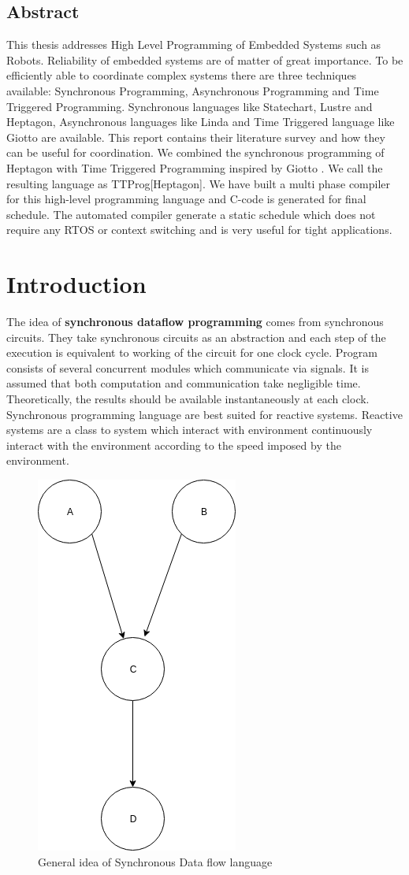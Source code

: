 \documentclass[16pt]{report}
\begin{document}
\section*{Abstract}
This thesis addresses High Level Programming of Embedded Systems such as Robots. Reliability of embedded systems are of matter of great importance. To be efficiently able to coordinate complex systems there are three techniques available: Synchronous Programming, Asynchronous Programming and Time Triggered Programming. Synchronous languages like Statechart, Lustre and Heptagon, Asynchronous languages like Linda and Time Triggered language like Giotto are available. This report contains their literature survey and how they can be useful for coordination. We combined the synchronous programming of Heptagon \cite{heptagon} with Time Triggered Programming inspired by Giotto \cite{giotto}. We call the resulting language as TTProg[Heptagon]. We have built a multi phase compiler for this high-level programming language and C-code is generated for final schedule. The automated compiler generate a static schedule which does not require any RTOS or context switching and is very useful for tight applications.

\tableofcontents
\newpage
\listoffigures

\newpage


\chapter{Introduction}
The idea of \textbf{synchronous dataflow programming} comes from synchronous circuits. They take synchronous circuits as an abstraction and each step of the  execution is equivalent to working of the circuit for one clock cycle. Program consists of several concurrent modules which communicate via signals. It is assumed that both computation and communication take negligible time. Theoretically, the results should be available instantaneously at each clock. \\
Synchronous programming language are best suited for reactive systems. Reactive systems are a class to system which interact with environment continuously interact with the environment according to the speed imposed by the environment.


\begin{figure}[H]
\centering
\includegraphics[width=0.25\linewidth]{fig5.png}
\caption{General idea of Synchronous Data flow language}
\end{figure}
\end{document}
